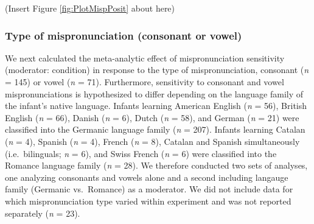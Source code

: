 \documentclass[man, noextraspace]{apa6}
\begin{document}
(Insert Figure \ref{fig:PlotMispPosit} about here)

\hypertarget{type-of-mispronunciation-consonant-or-vowel}{%
\subsubsection{Type of mispronunciation (consonant or vowel)}\label{type-of-mispronunciation-consonant-or-vowel}}

We next calculated the meta-analytic effect of mispronunciation sensitivity (moderator: condition) in response to the type of mispronunciation, consonant (\emph{n} = 145) or vowel (\emph{n} = 71). Furthermore, sensitivity to consonant and vowel mispronunciations is hypothesized to differ depending on the language family of the infant's native language. Infants learning American English (\emph{n} = 56), British English (\emph{n} = 66), Danish (\emph{n} = 6), Dutch (\emph{n} = 58), and German (\emph{n} = 21) were classified into the Germanic language family (\emph{n} = 207). Infants learning Catalan (\emph{n} = 4), Spanish (\emph{n} = 4), French (\emph{n} = 8), Catalan and Spanish simultaneously (i.e.~bilinguals; \emph{n} = 6), and Swiss French (\emph{n} = 6) were classified into the Romance language family (\emph{n} = 28). We therefore conducted two sets of analyses, one analyzing consonants and vowels alone and a second including langauge family (Germanic vs.~Romance) as a moderator. We did not include data for which mispronunciation type varied within experiment and was not reported separately (\emph{n} = 23).
\end{document}
